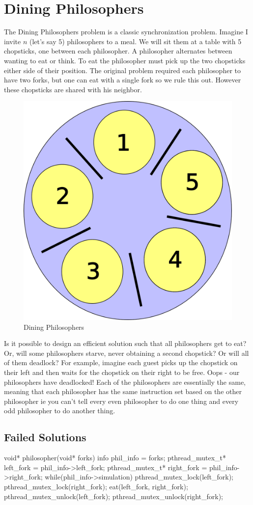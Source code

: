 \todo %

\section{Dining Philosophers}

The Dining Philosophers problem is a classic synchronization problem. Imagine I invite $n$ (let's say 5) philosophers to a meal. We will sit them at a table with 5 chopsticks, one between each philosopher. A philosopher alternates between wanting to eat or think. To eat the philosopher must pick up the two chopsticks either side of their position. The original problem required each philosopher to have two forks, but one can eat with a single fork so we rule this out. However these chopsticks are shared with his neighbor.

\begin{figure}
  \begin{center}
\includegraphics[width=.2\textwidth]{deadlock/images/5DiningPhilosophers.png}
\end{center}
  \caption{Dining Philosophers}
\end{figure}

Is it possible to design an efficient solution such that all philosophers get to eat? Or, will some philosophers starve, never obtaining a second chopstick? Or will all of them deadlock? For example, imagine each guest picks up the chopstick on their left and then waits for the chopstick on their right to be free. Oops - our philosophers have deadlocked! Each of the philosophers are essentially the same, meaning that each philosopher has the same instruction set based on the other philosopher ie you can't tell every even philosopher to do one thing and every odd philosopher to do another thing.

\subsection{Failed Solutions}

\begin{code}[language=C]
void* philosopher(void* forks){
     info phil_info = forks;
     pthread_mutex_t* left_fork = phil_info->left_fork;
     pthread_mutex_t* right_fork = phil_info->right_fork;
     while(phil_info->simulation){
          pthread_mutex_lock(left_fork);
          pthread_mutex_lock(right_fork);
          eat(left_fork, right_fork);
          pthread_mutex_unlock(left_fork);
          pthread_mutex_unlock(right_fork);
     }
}
\end{code}

